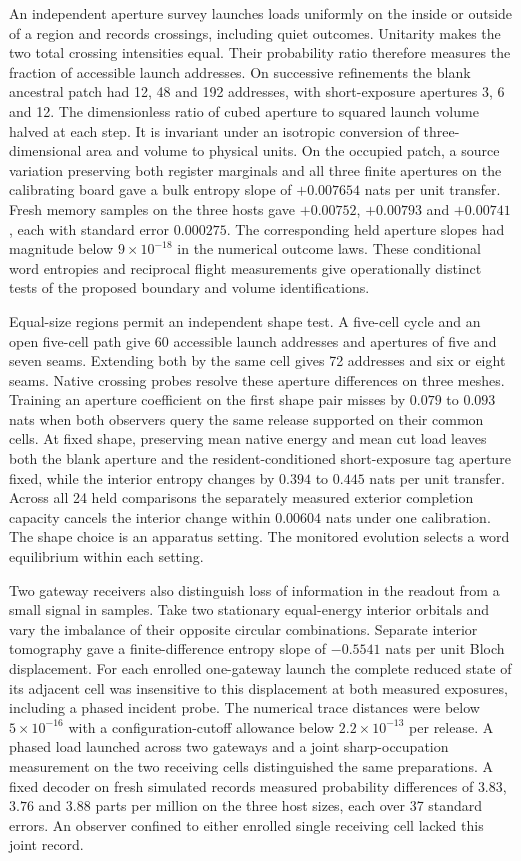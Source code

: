 \documentclass[11pt]{article}
\begin{document}
An independent aperture survey launches loads uniformly on the inside
or outside of a region and records crossings, including quiet outcomes.
Unitarity makes the two total crossing intensities equal. Their probability
ratio therefore measures the fraction of accessible launch addresses.
On successive refinements the blank ancestral patch had 12, 48 and 192
addresses, with short-exposure apertures 3, 6 and 12. The dimensionless
ratio of cubed aperture to squared launch volume halved at each step.
It is invariant under an isotropic conversion of three-dimensional area
and volume to physical units. On the occupied patch, a source variation
preserving both register marginals and all three finite apertures on the
calibrating board gave a bulk entropy slope of $+0.007654$ nats per
unit transfer. Fresh memory samples on the three hosts gave $+0.00752$,
$+0.00793$ and $+0.00741$, each with standard error $0.000275$.
The corresponding held aperture slopes had magnitude below
$9\times10^{-18}$ in the numerical outcome laws. These conditional
word entropies and reciprocal flight measurements give operationally
distinct tests of the proposed boundary and volume identifications.

Equal-size regions permit an independent shape test. A five-cell cycle
and an open five-cell path give 60 accessible launch addresses and
apertures of five and seven seams. Extending both by the same cell gives
72 addresses and six or eight seams. Native crossing probes resolve
these aperture differences on three meshes. Training an aperture
coefficient on the first shape pair misses by $0.079$ to $0.093$ nats
when both observers query the same release supported on their common
cells. At fixed shape, preserving mean native energy and mean cut
load leaves both the blank aperture and the resident-conditioned
short-exposure tag aperture fixed, while the interior entropy changes
by $0.394$ to $0.445$ nats per unit transfer. Across all 24 held
comparisons the separately measured exterior completion capacity
cancels the interior change within $0.00604$ nats under one calibration.
The shape choice is an apparatus setting. The monitored evolution
selects a word equilibrium within each setting.

Two gateway receivers also distinguish loss of information in the readout
from a small signal in samples. Take two stationary equal-energy interior
orbitals and vary the imbalance of their opposite circular combinations.
Separate interior tomography gave a finite-difference entropy slope of $-0.5541$ nats
per unit Bloch displacement. For each enrolled one-gateway launch the
complete reduced state of its adjacent cell was insensitive to this
displacement at both measured exposures, including a phased incident
probe. The numerical trace distances were below $5\times10^{-16}$ with
a configuration-cutoff allowance below $2.2\times10^{-13}$ per release.
A phased load launched across two gateways and a joint sharp-occupation
measurement on the two receiving cells distinguished the same preparations.
A fixed decoder on fresh simulated records measured probability differences
of $3.83$, $3.76$ and $3.88$ parts per million on the three host sizes,
each over 37 standard errors. An observer confined to either enrolled
single receiving cell lacked this joint record.
\end{document}
